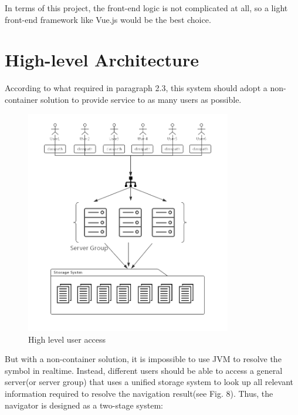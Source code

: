 \documentclass[runningheads]{llncs}
\begin{document}
In terms of this project, the front-end logic is not complicated at all, so a light front-end framework like Vue.js would be the best choice. 

\section{High-level Architecture}

According to what required in paragraph 2.3, this system should adopt a non-container solution to provide service to as many users as possible. 

\begin{figure}[H]
	\centering
	\includegraphics[width=9cm]{pic/high-level-diagram.png}
	\caption{High level user access}
	\label{High level user access}
\end{figure}

But with a non-container solution, it is impossible to use JVM to resolve the symbol in realtime. Instead, different users should be able to access a general server(or server group) that uses a unified storage system to look up all relevant information required to resolve the navigation result(see Fig. 8). Thus, the navigator is designed as a two-stage system:
\end{document}
